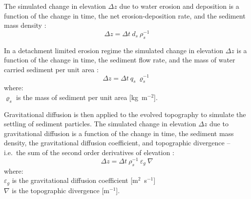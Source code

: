 \documentclass[gmd, manuscript]{copernicus}
\begin{document}
The simulated change in elevation $\Delta z$
due to water erosion and deposition
is a function of
the change in time, the net erosion-deposition rate, and the sediment mass density 
\citep{Mitasova2013}:
\begin{equation}
\label{eq:evolution} 
{\Delta z = \Delta t ~ d_s ~ \rho_s^{-1} }
\end{equation}

\noindent
In a detachment limited erosion regime
the simulated change in elevation $\Delta z$
is a function of
the change in time, the sediment flow rate, and the mass of water carried sediment per unit area
\citep{Mitasova2013}:
\begin{equation}
\label{eq:flux_evolution} 
{\Delta z = \Delta t ~ q_s~ \varrho_s^{-1} } 
\end{equation}
{\small
\noindent
where: \\
\noindent
\hspace*{0.5em} $\varrho_s$ is the mass of sediment per unit area [\unit{kg ~ m}$^{-2}$].\\
}



\noindent
Gravitational diffusion is then applied to the evolved topography
to simulate the settling of sediment particles. 
The simulated change in elevation $\Delta z$ %
due to gravitational diffusion 
is a function of the change in time, the sediment mass density, 
the gravitational diffusion coefficient, and topographic divergence 
-- i.e.~the sum of the second order derivatives of elevation
\citep{thaxton2004}:
\begin{equation}
\label{eq:grav_diffusion} 
{\Delta z = \Delta t ~ \rho_s^{-1} ~ \varepsilon_g ~ \nabla}
\end{equation}
{\small
\noindent
where: \\
\noindent
\hspace*{0.5em} $\varepsilon_g$ is the gravitational diffusion coefficient [\unit{m}$^{2}$~\unit{s}$^{-1}$]\\ \hspace*{0.5em} $\nabla$ is the topographic divergence [\unit{m}$^{-1}$].\\
}
\end{document}
